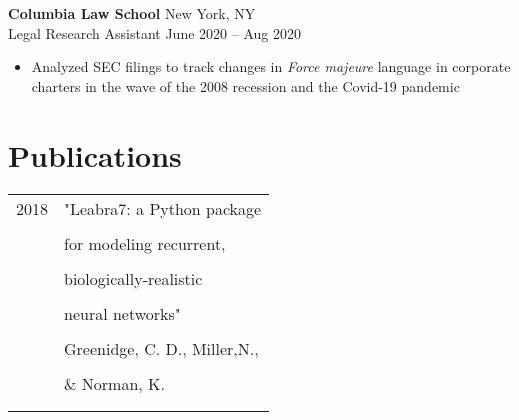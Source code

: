 \documentclass[12pt]{article}
\newcommand{\entry}[4]{{{\textbf{#1}}} \hfill #3 \\ #2 \hfill #4}
\newcommand{\tableentry}[3]{\textsc{#1} & #2\expandafter\ifstrequal\expandafter{#3}{}{\\}{\\[6pt]}}
\begin{document}
\begin{paracol}{2}
\entry{Columbia Law School}{Legal Research Assistant}{New York, NY}{June 2020 -- Aug 2020}
\begin{itemize}[noitemsep,leftmargin=3.5mm,rightmargin=0mm,topsep=6pt]
  \item Analyzed SEC filings to track changes in \textit{Force majeure} language in corporate charters in the wave of the 2008 recession and the Covid-19 pandemic
\end{itemize}

\switchcolumn

\section{Publications}
\begin{supertabular}{rl}
  \tableentry{2018}{"Leabra7: a Python package}{}
  \tableentry{}{for modeling recurrent,}{}
  \tableentry{}{biologically-realistic}{}
  \tableentry{}{neural networks"}{}
  \tableentry{}{Greenidge, C. D., Miller,N.,}{}
  \tableentry{}{\& Norman, K.}{}
\end{supertabular}

\end{paracol}
\end{document}
